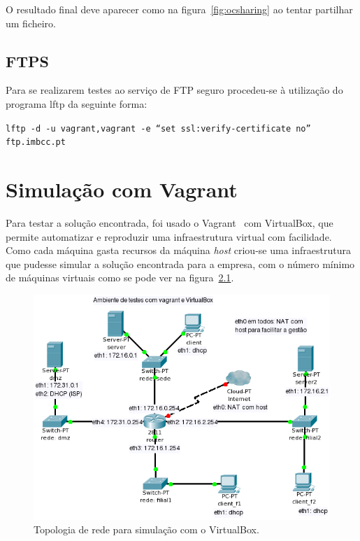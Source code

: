 \documentclass[12pt,a4paper]{report}
\begin{document}
O resultado final deve aparecer como na figura~\ref{fig:ocsharing} ao tentar partilhar um ficheiro.

\section{FTPS}

Para se realizarem testes ao serviço de FTP seguro procedeu-se à utilização do programa lftp da seguinte forma:

\texttt{lftp -d -u vagrant,vagrant -e ``set ssl:verify-certificate no'' ftp.imbcc.pt}

\chapter{Simulação com Vagrant}

Para testar a solução encontrada, foi usado o Vagrant~\cite{Vagrant} com VirtualBox, que permite automatizar e reproduzir uma infraestrutura virtual com facilidade. Como cada máquina gasta recursos da máquina \emph{host} criou-se uma infraestrutura que pudesse simular a solução encontrada para a empresa, com o número mínimo de máquinas virtuais como se pode ver na figura~\ref{fig:virtualbox}.

\begin{figure}[H]
\begin{center}
\includegraphics[width=\textwidth]{figs/diagrama-virtualbox.png}
\end{center}
\caption{Topologia de rede para simulação com o VirtualBox.}
\label{fig:virtualbox}
\end{figure}
\end{document}
